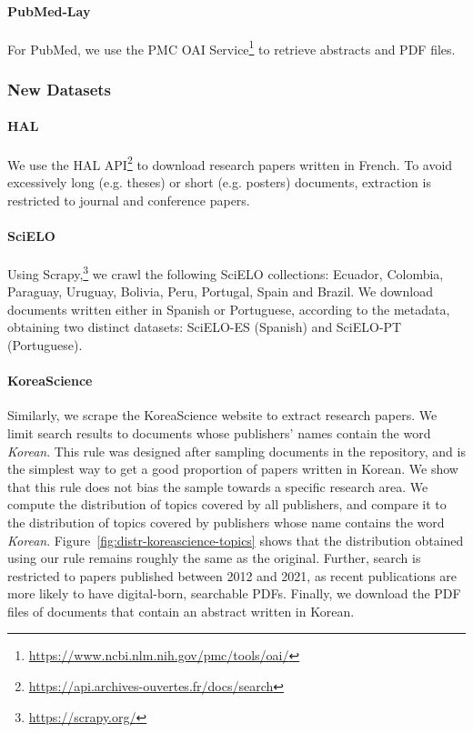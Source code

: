 \paragraph{PubMed-Lay}

For PubMed, we use the PMC OAI Service\footnote{\url{https://www.ncbi.nlm.nih.gov/pmc/tools/oai/}} to retrieve abstracts and PDF files. 

\subsubsection{New Datasets}

\paragraph{HAL}

We use the HAL API\footnote{\url{https://api.archives-ouvertes.fr/docs/search}} to download research papers written in French. To avoid excessively long (e.g. theses) or short (e.g. posters) documents, extraction is restricted to journal and conference papers. 

\paragraph{SciELO}

Using Scrapy,\footnote{\url{https://scrapy.org/}} we crawl the following SciELO collections: Ecuador, Colombia, Paraguay, Uruguay, Bolivia, Peru, Portugal, Spain and Brazil. We download documents written either in Spanish or Portuguese, according to the metadata, obtaining two distinct datasets: SciELO-ES (Spanish) and SciELO-PT (Portuguese).

\paragraph{KoreaScience}

Similarly, we scrape the KoreaScience website to extract research papers. We limit search results to documents whose publishers’ names contain the word \emph{Korean}. This rule was designed after sampling documents in the repository, and is the simplest way to get a good proportion of papers written in Korean. We show that this rule does not bias the sample towards a specific research area. We compute the distribution of topics covered by all publishers, and compare it to the distribution of topics covered by publishers whose name contains the word \textit{Korean}. Figure~\ref{fig:distr-koreascience-topics} shows that the distribution obtained using our rule remains roughly the same as the original. Further, search is restricted to papers published between 2012 and 2021, as recent publications are more likely to have digital-born, searchable PDFs. Finally, we download the PDF files of documents that contain an abstract written in Korean. 

